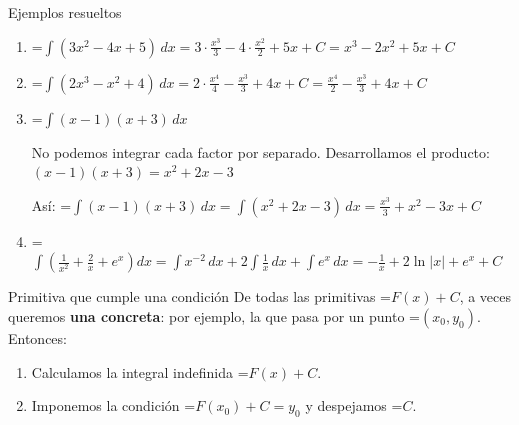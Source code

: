 \documentclass[11pt,a4paper]{article}
\newcommand{\fmm}[1]{\setbox0=\hbox{$#1$}\ifdim\wd0>\linewidth\[#1\]\else\mbox{\box0}\fi}
\begin{document}
  
\begin{fmex}{Ejemplos resueltos}
\begin{enumerate}[label=\textbf{\arabic*.},leftmargin=*]
\item \fmm{\displaystyle\int(3x^2-4x+5)\,dx =\displaystyle 3\cdot\frac{x^3}{3}-4\cdot\frac{x^2}{2}+5x+C = x^3-2x^2+5x+C}
\item \fmm{\displaystyle\int(2x^3-x^2+4)\,dx \displaystyle =2\cdot\frac{x^4}{4}-\frac{x^3}{3}+4x+C=\frac{x^4}{2}-\frac{x^3}{3}+4x+C}
\item \fmm{\displaystyle\int(x-1)(x+3)\,dx}

No podemos integrar cada factor por separado. Desarrollamos el producto: $(x-1)(x+3)=x^2+2x-3$

\vspace*{0.2cm}

Así: \fmm{\displaystyle\int(x-1)(x+3)\,dx=\displaystyle\int(x^2+2x-3)\,dx=\frac{x^3}{3}+x^2-3x+C}
\item \fmm{\displaystyle\int\left(\frac{1}{x^2}+\frac{2}{x}+e^x\right)dx\displaystyle =\int x^{-2}\,dx+2\int\frac1x\,dx+\int e^x\,dx=-\frac1x+2\ln|x|+e^x+C}
\end{enumerate}
\end{fmex}

  
\begin{fmprop}{Primitiva que cumple una condición}
De todas las primitivas \fmm{F(x)+C}, a veces queremos \textbf{una concreta}: por ejemplo, la que pasa por un punto \fmm{(x_0,y_0)}. Entonces:

      
\begin{enumerate}
\item Calculamos la integral indefinida \fmm{F(x)+C}.
\item Imponemos la condición \fmm{F(x_0)+C=y_0} y despejamos \fmm{C}.
\end{enumerate}
\end{fmprop}
\end{document}
